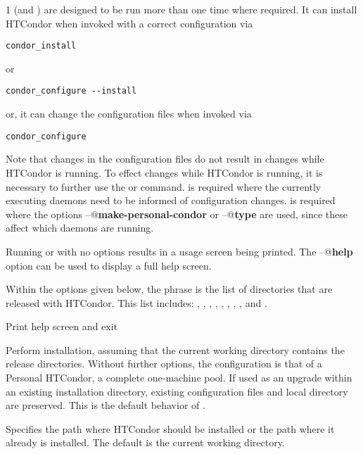 \begin{ManPage}{\label{man-condor-configure}}{1}
 (and ) are designed to be run more
than one time where required.
It can install HTCondor when invoked with a correct configuration via
\begin{verbatim}
condor_install
\end{verbatim}
or 
\begin{verbatim}
condor_configure --install
\end{verbatim}
or, it can change the configuration files when invoked via
\begin{verbatim}
condor_configure
\end{verbatim}
Note that changes in the configuration files do not result
in changes while HTCondor is running.
To effect changes while HTCondor is running,
it is necessary to further use the  or 
command.
  is required where the currently executing
daemons need to be informed of configuration changes.
 is required where the options
\verb@--@\textbf{make-personal-condor} or
\verb@--@\textbf{type}
are used, since these affect which daemons are running.

Running  or  with no options results
in a usage screen being printed.
The \verb@--@\textbf{help} option can be used to display a full help screen.

Within the options given below, 
the phrase  is the list of directories that are
released with HTCondor.  This list includes: 
, , , ,
, , , ,
 and .

\begin{Options}
   {Print help screen and exit}

   {Perform installation, assuming that
    the current working directory contains the release directories.
    Without further options, the configuration is that of
    a Personal HTCondor, a complete one-machine pool.
    If used as an 
    upgrade within an existing installation directory, existing 
    configuration files and local directory are preserved.  This
    is the default behavior of . }

   {Specifies the path
    where HTCondor should be installed or the path where it already is
    installed. The default is the current working directory.}


\end{Options}
\end{ManPage}
